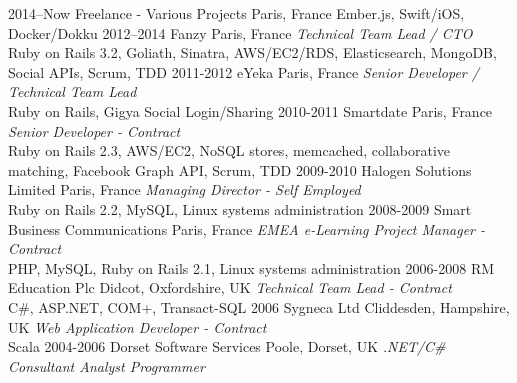 \documentclass[]{friggeri-cv} %
\begin{document}
\begin{entrylist}
\entry
{2014--Now}
{Freelance - Various Projects}
{Paris, France}
{Ember.js, Swift/iOS, Docker/Dokku}
\entry
{2012--2014}
{Fanzy}
{Paris, France}
{\emph{Technical Team Lead / CTO} \\
{\color{green}Ruby on Rails 3.2, Goliath, Sinatra, AWS/EC2/RDS, Elasticsearch, MongoDB, Social APIs, Scrum, TDD}}
\entry
{2011-2012}
{eYeka}
{Paris, France}
{\emph{Senior Developer / Technical Team Lead} \\
Ruby on Rails, Gigya Social Login/Sharing}
\entry
{2010-2011}
{Smartdate}
{Paris, France}
{\emph{Senior Developer - Contract} \\
Ruby on Rails 2.3, AWS/EC2, NoSQL stores, memcached, collaborative matching, Facebook Graph API, Scrum, TDD}
\entry
{2009-2010}
{Halogen Solutions Limited}
{Paris, France}
{\emph{Managing Director - Self Employed} \\
Ruby on Rails 2.2, MySQL, Linux systems administration}
\entry
{2008-2009}
{Smart Business Communications}
{Paris, France}
{\emph{EMEA e-Learning Project Manager - Contract} \\
PHP, MySQL, Ruby on Rails 2.1, Linux systems administration}
\entry
{2006-2008}
{RM Education Plc}
{Didcot, Oxfordshire, UK}
{\emph{Technical Team Lead - Contract} \\
C\#, ASP.NET, COM+, Transact-SQL}
\entry
{2006}
{Sygneca Ltd}
{Cliddesden, Hampshire, UK}
{\emph{Web Application Developer - Contract} \\
Scala}
\entry
{2004-2006}
{Dorset Software Services}
{Poole, Dorset, UK}
{\emph{.NET/C\# Consultant Analyst Programmer}}
\end{entrylist}


\end{document}
